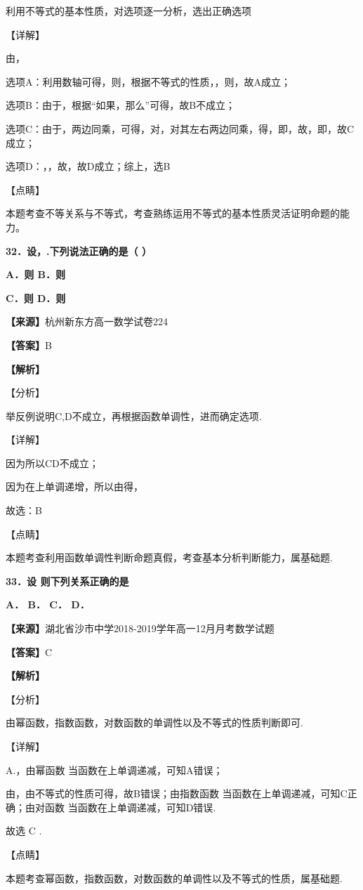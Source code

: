 利用不等式的基本性质，对选项逐一分析，选出正确选项

【详解】

由，

选项A：利用数轴可得，则，根据不等式的性质，，则，故A成立；

选项B：由于，根据``如果，那么''可得，故B不成立；

选项C：由于，两边同乘，可得，对，对其左右两边同乘，得，即，故，即，故C成立；

选项D：，，故，故D成立；综上，选B

【点睛】

本题考查不等关系与不等式，考查熟练运用不等式的基本性质灵活证明命题的能力。

\textbf{32．设，.下列说法正确的是（ ）}

\textbf{A．则 B．则}

\textbf{C．则 D．则}

\textbf{【来源】}杭州新东方高一数学试卷224

\textbf{【答案】}B

\textbf{【解析】}

【分析】

举反例说明C,D不成立，再根据函数单调性，进而确定选项.

【详解】

因为所以CD不成立；

因为在上单调递增，所以由得，

故选：B

【点睛】

本题考查利用函数单调性判断命题真假，考查基本分析判断能力，属基础题.

\textbf{33．设 则下列关系正确的是}

\textbf{A． B． C． D．}

\textbf{【来源】}湖北省沙市中学2018-2019学年高一12月月考数学试题

\textbf{【答案】}C

\textbf{【解析】}

【分析】

由幂函数，指数函数，对数函数的单调性以及不等式的性质判断即可.

【详解】

A.，由幂函数 当函数在上单调递减，可知A错误；

由，由不等式的性质可得，故B错误；由指数函数
当函数在上单调递减，可知C正确；由对函数 当函数在上单调递减，可知D错误.

故选 C .

【点睛】

本题考查幂函数，指数函数，对数函数的单调性以及不等式的性质，属基础题.


